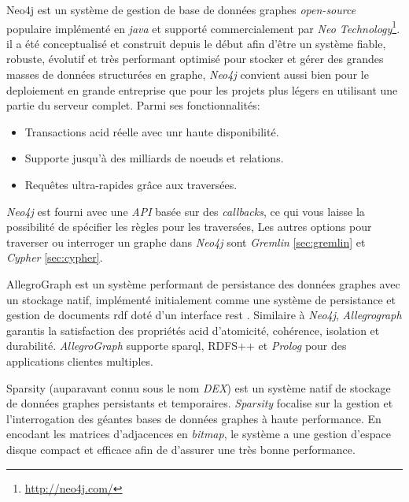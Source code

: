     \textsf{Neo4j} \cite{neo4j} est un système de gestion de base de
    données graphes \textit{open-source} populaire implémenté en
    \textit{java} et supporté commercialement par \textit{Neo
      Technology}\footnote{\url{http://neo4j.com/}}. il a été
    conceptualisé et construit depuis le début afin d'être un système
    fiable, robuste, évolutif et très performant optimisé pour stocker
    et gérer des grandes masses de données structurées en graphe,
    \textit{Neo4j} convient aussi bien pour le deploiement en grande
    entreprise que pour les projets plus légers en utilisant une
    partie du serveur complet. Parmi ses fonctionnalités:\medskip

    \begin{itemize}\renewcommand\labelitemi{--}
    \item Transactions \acrshort{acid} réelle avec unr haute disponibilité.
    \item Supporte jusqu'à des milliards de noeuds et relations.
    \item Requêtes ultra-rapides grâce aux traversées.
    \end{itemize}
    \enddescription
    \medskip

    \textit{Neo4j} est fourni avec une \textit{API} basée sur des
    \textit{callbacks}, ce qui vous laisse la possibilité de spécifier
    les règles pour les traversées, Les autres options pour traverser
    ou interroger un graphe dans \textit{Neo4j} sont \textit{Gremlin}
    \ref{sec:gremlin} et \textit{Cypher} \ref{sec:cypher}.\bigskip

    \textsf{AllegroGraph} \cite{allegrograph} est un système performant
    de persistance des données graphes avec un stockage natif,
    implémenté initialement comme une système de persistance et
    gestion de documents \acrshort{rdf} doté d'un interface
    \acrshort{rest} \cite{fielding2000architectural}. Similaire à
    \emph{Neo4j}, \emph{Allegrograph} garantis la satisfaction des
    propriétés \acrshort{acid} d'atomicité, cohérence, isolation et
    durabilité. \emph{AllegroGraph} supporte \acrshort{sparql}, RDFS++
    et \textit{Prolog} pour des applications clientes
    multiples.\bigskip

    \textsf{Sparsity} \cite{sparksee} (auparavant connu sous le nom
    \emph{DEX}) est un système natif de stockage de données graphes
    persistants et temporaires. \emph{Sparsity} focalise sur la
    gestion et l'interrogation des géantes bases de données graphes à
    haute performance. En encodant les matrices d'adjacences en
    \emph{bitmap}, le système a une gestion d'espace disque compact et
    efficace afin de d'assurer une très bonne performance.\medskip
    \newpage

